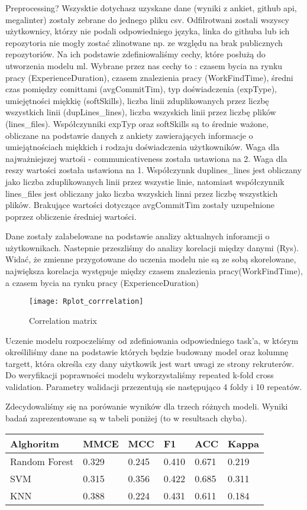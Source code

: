 Preprocessing?
Wszysktie dotychasz uzyskane dane (wyniki z ankiet, github api, megalinter) zostały zebrane do jednego pliku csv. Odfilrotwani zostali wszyscy użytkownicy, którzy nie podali odpowiedniego języka, linka do githuba lub ich repozytoria nie mogły zostać zlinotwane np. ze względu na brak publicznych repozytoriów. Na ich podstawie zdefiniowaliśmy cechy, które posłużą do utworzenia modelu ml. Wybrane przez nas cechy to : czasem bycia na rynku pracy (ExperienceDuration), czasem znalezienia pracy (WorkFindTime), średni czas pomiędzy comittami (avgCommitTim), typ doświadczenia (expType), umiejętności miękkię (softSkills), liczba linii zduplikowanych przez liczbę wszystkich linii (dupLines\_lines), liczba wszyskich linii przez liczbę plików (lines\_files). Współczynniki expTyp oraz softSkills są to średnie ważone, obliczane na podstawie danych z ankiety zawierających informacje o umiejątnościach miękkich i rodzaju doświadczenia użytkowników. Waga dla najważniejszej wartośi - communicativeness została ustawiona na 2. Waga dla reszy wartości została ustawiona na 1. Współczynnk duplines\_lines jest obliczany jako liczba zduplikowanych linii przez wszystie linie, natomiast współczynnik lines\_files jest obliczany jako liczba wszyskich linni przez liczbę wszystkich plików. Brakujące wartości dotyczące avgCommitTim zostały uzupełnione poprzez obliczenie średniej wartości.
 

Dane zostały zalabelowane na podstawie analizy aktualnych inforamcji o użytkownikach. Nastepnie przeszliśmy do analizy korelacji między danymi (Rys). Widać, że zmienne przygotowane do uczenia modelu nie są ze sobą skorelowane, największa korelacja występuje między czasem znalezienia pracy(WorkFindTime), a czasem bycia na rynku pracy (ExperienceDuration)

\begin{figure}[htp]
\centering
\texttt{[image: Rplot\_corrrelation]}
\caption{Correlation matrix}
\label{fig:correlation-matrix}
\end{figure}

Uczenie modelu rozpoczeliśmy od zdefiniowania odpowiedniego task'a, w którym określiliśmy dane na podstawie których będzie budowany model oraz kolumnę targett, która określa czy dany użytkowik jest wart uwagi ze strony rekruterów. Do weryfikacji poprawności modelu wykorzystaliśmy repeated k-fold cross validation. Parametry walidacji przezentują sie następująco 4 foldy i 10 repeatów. 

Zdecydowaliśmy się na porówanie wyników dla trzech różnych modeli. Wyniki badań zaprezentowane są w tabeli poniżej (to w resultsach chyba).
\begin{center}
\begin{tabular}{ | m{5em} | m{5em}| m{5em} | m{5em}| m{5em} | m{5em}| } 
\hline
 Alghoritm & MMCE & MCC & F1 & ACC & Kappa\\ 
 \hline
 Random Forest & 0.329 & 0.245 & 0.410 & 0.671 & 0.219 \\ 
\hline
 SVM & 0.315 & 0.356 & 0.422 & 0.685 & 0.311 \\ 
\hline
 KNN & 0.388 & 0.224 & 0.431 & 0.611 & 0.184\\ 
\hline
\end{tabular}
\end{center}